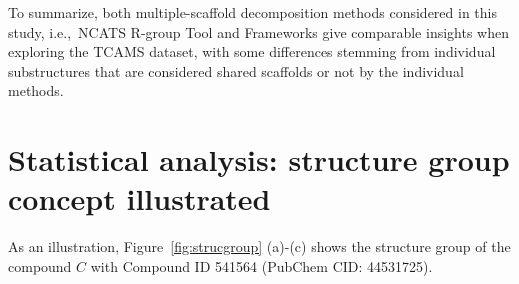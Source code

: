 \documentclass[11pt,letterpaper,biochem]{article}
\newcommand*\fref[1]{Figure~\ref{fig:#1}}
\newcommand*\sref[1]{Section~\ref{sec:#1}}
\newcommand*\ie{i.e.,~}
\begin{document}
To summarize, both multiple-scaffold decomposition methods considered in this study, \ie NCATS R-group Tool and Frameworks give comparable insights when exploring the TCAMS dataset, with some differences stemming from individual substructures that are considered shared scaffolds or not by the individual methods.

\newpage
\section{Statistical analysis: structure group concept illustrated}
\label{sec:strucgroup}
As an illustration, \fref{strucgroup} (a)-(c) shows the structure group of the compound $C$ with Compound ID 541564 (PubChem CID: 44531725). 
\end{document}
